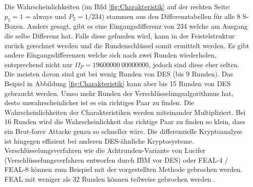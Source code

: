 Die Wahrscheinlichkeiten (im Bild \ref{fig:Charakteristik} auf der rechten Seite: $p_{1} = 1$ = always und $P_{2} = 1/234$) stammen aus den Differenztabellen für alle 8 S-Boxen. Anders gesagt, gibt es eine Eingangsdifferenz von 234 welche am Ausgang die selbe Differenz hat. Falls diese gefunden wird, kann in der Feistelstruktur zurück gerechnet werden und die Rundenschlüssel somit ermittelt werden. 
Es gibt andere Eingangsdifferenzen welche sich nach zwei Runden wiederholen, entsprechend nicht nur $\Omega_{P} = 19600000\ 00000000$,  jedoch sind diese eher selten. Die meisten davon sind gut bei wenig Runden von DES (bis 9 Runden).
Das Beipiel in Abbildung \ref{fig:Charakteristik} kann aber bis 15 Runden von DES gebraucht werden. 
Umso mehr Runden der Verschlüsselungsalgorithmus hat, desto unwahrscheinlicher ist es ein richtiges Paar zu finden. Die Wahrscheinlichkeiten der Charakteristiken werden miteinander Multipliziert.
Bei 16 Runden wird die Wahrscheinlichkeit das richtige Paar zu finden so klein, dass ein Brut-force Attacke genau so schneller wäre.
Die differenzielle Kryptoanalyse ist hingegen effizient bei anderen DES-ähnliche Kryptosysteme. Verschlüsselungsverfahren wie die Achtrunden-Variante von Lucifer (Verschlüsselungsverfahren entworfen durch IBM vor DES) oder FEAL-4 / FEAL-8 können zum Beispiel mit der vorgestellten Methode gebrochen werden. FEAL mit weniger als 32 Runden können teilweise gebrochen werden \cite{biham_differential_1990}.













